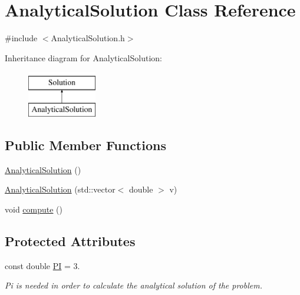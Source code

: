 \hypertarget{class_analytical_solution}{}\section{Analytical\+Solution Class Reference}
\label{class_analytical_solution}


{\ttfamily \#include $<$Analytical\+Solution.\+h$>$}

Inheritance diagram for Analytical\+Solution\+:\begin{figure}[H]
\begin{center}
\leavevmode
\includegraphics[height=2.000000cm]{class_analytical_solution}
\end{center}
\end{figure}
\subsection*{Public Member Functions}
\begin{DoxyCompactItemize}
\item 
\hyperlink{class_analytical_solution_a92a4ce87e863ec7f8aac59372306efd2}{Analytical\+Solution} ()
\item 
\hyperlink{class_analytical_solution_a9522a4a13b61dcc7f145e0fb39e5016d}{Analytical\+Solution} (std\+::vector$<$ double $>$ v)
\item 
void \hyperlink{class_analytical_solution_ae1ebc556a8dfed55b6c463625545d919}{compute} ()
\end{DoxyCompactItemize}
\subsection*{Protected Attributes}
\begin{DoxyCompactItemize}
\item 
\mbox{\label{class_analytical_solution_a7790fe079a6319530e2d203c5ff64b23}} 
const double \hyperlink{class_analytical_solution_a7790fe079a6319530e2d203c5ff64b23}{PI} = 3.
\begin{DoxyCompactList}\small\item\em Pi is needed in order to calculate the analytical solution of the problem. \end{DoxyCompactList}\end{DoxyCompactItemize}


